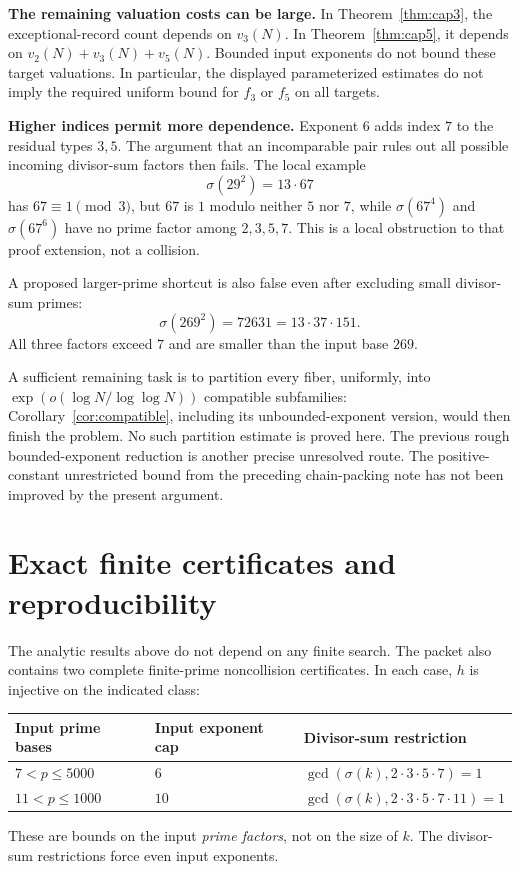 \documentclass[11pt]{article}
\begin{document}
\textbf{The remaining valuation costs can be large.} In Theorem~\ref{thm:cap3}, the exceptional-record count depends on $v_3(N)$. In Theorem~\ref{thm:cap5}, it depends on $v_2(N)+v_3(N)+v_5(N)$. Bounded input exponents do not bound these target valuations. In particular, the displayed parameterized estimates do not imply the required uniform bound for $f_3$ or $f_5$ on all targets.

\textbf{Higher indices permit more dependence.} Exponent $6$ adds index $7$ to the residual types $3,5$. The argument that an incomparable pair rules out all possible incoming divisor-sum factors then fails. The local example
\[
 \sigma(29^2)=13\cdot67
\]
has $67\equiv1\pmod3$, but $67$ is $1$ modulo neither $5$ nor $7$, while $\sigma(67^4)$ and $\sigma(67^6)$ have no prime factor among $2,3,5,7$. This is a local obstruction to that proof extension, not a collision.

A proposed larger-prime shortcut is also false even after excluding small divisor-sum primes:
\[
 \sigma(269^2)=72631=13\cdot37\cdot151.
\]
All three factors exceed $7$ and are smaller than the input base $269$.

A sufficient remaining task is to partition every fiber, uniformly, into $\exp(o(\log N/\log\log N))$ compatible subfamilies: Corollary~\ref{cor:compatible}, including its unbounded-exponent version, would then finish the problem. No such partition estimate is proved here. The previous rough bounded-exponent reduction is another precise unresolved route. The positive-constant unrestricted bound from the preceding chain-packing note has not been improved by the present argument.

\section{Exact finite certificates and reproducibility}
The analytic results above do not depend on any finite search. The packet also contains two complete finite-prime noncollision certificates. In each case, $h$ is injective on the indicated class:
\begin{center}
\begin{tabular}{@{}lll@{}}
\toprule
Input prime bases & Input exponent cap & Divisor-sum restriction\\
\midrule
$7<p\le5000$ & $6$ & $\gcd(\sigma(k),2\cdot3\cdot5\cdot7)=1$\\
$11<p\le1000$ & $10$ & $\gcd(\sigma(k),2\cdot3\cdot5\cdot7\cdot11)=1$\\
\bottomrule
\end{tabular}
\end{center}
These are bounds on the input \emph{prime factors}, not on the size of $k$. The divisor-sum restrictions force even input exponents.
\end{document}
